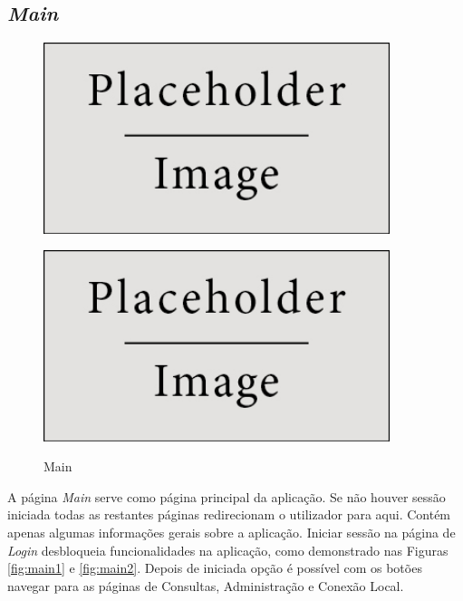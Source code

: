 \documentclass[11pt,twoside,a4paper]{report}
\begin{document}
\subsection{\textit{Main}}
\begin{figure}[H]
\centering
	\begin{minipage}{.5\textwidth}
		\begin{center}
			\includegraphics[width=0.9\textwidth]{placeholder} %
			\label{fig:main1}
		\end{center}
	\end{minipage}%
	\begin{minipage}{.5\textwidth}
		\begin{center}
			\includegraphics[width=0.9\textwidth]{placeholder} %
			\label{fig:main2}
		\end{center}
	\end{minipage}
	\caption{Main}
	\label{fig:main0}
\end{figure}
A página \textit{Main} serve como página principal da aplicação. Se não houver sessão iniciada todas as restantes páginas redirecionam o utilizador para aqui. Contém apenas algumas informações gerais sobre a aplicação. Iniciar sessão na página de \textit{Login} desbloqueia funcionalidades na aplicação, como demonstrado nas Figuras \ref{fig:main1} e \ref*{fig:main2}. Depois de iniciada opção é possível com os botões navegar para as páginas de Consultas, Administração e Conexão Local.
\end{document}
